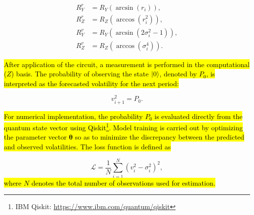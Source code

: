 \documentclass[preprints,article,accept,pdftex,oneauthor]{Definitions/mdpi}
\begin{document}
\begin{align}
R_Y^r
&=
R_Y\!\left(\arcsin(r_i)\right),
\\
R_Z^r
&=
R_Z\!\left(\arccos(r_i^2)\right),
\\
R_Y^v
&=
R_Y\!\left(\arcsin(2\sigma_i^2-1)\right),
\\
R_Z^v
&=
R_Z\!\left(\arccos(\sigma_i^4)\right).
\end{align}

\hl{After application of the circuit, a measurement is performed in the
computational ($Z$) basis. The probability of observing the state
$\ket{0}$, denoted by $P_0$, is interpreted as the forecasted volatility
for the next period:}

\begin{equation}
v_{i+1}^2=P_0.
\end{equation}

\hl{For numerical implementation, the probability $P_0$ is evaluated directly
from the quantum state vector using
Qiskit\footnote{IBM Qiskit: \url{https://www.ibm.com/quantum/qiskit}}.
Model training is carried out by optimizing the parameter vector
$\boldsymbol{\theta}$ so as to minimize the discrepancy between the
predicted and observed volatilities. The loss function is defined as}

\begin{equation}
\mathcal{L}
= \frac1N
\sum_{i=1}^{N}
\left(
v_i^2-\sigma_i^2
\right)^2,
\end{equation}
\hl{where $N$ denotes the total number of observations used for estimation.}



 


 
\end{document}
